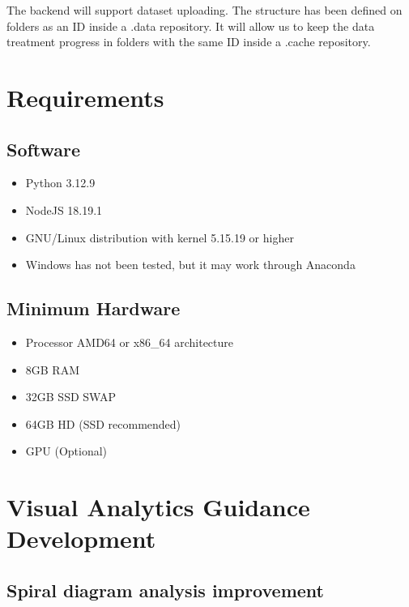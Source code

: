 \documentclass[a4paper]{article}
\begin{document}
The backend will support dataset uploading. The structure has been defined on folders as an ID inside a .data repository. It will allow us to keep the data treatment progress in folders with the same ID inside a .cache repository.

\section{Requirements}
\label{sec:org3f6bbcd}

\subsection{Software}
\label{sec:org50fc679}

\begin{itemize}
\item Python 3.12.9

\item NodeJS 18.19.1

\item GNU/Linux distribution with kernel 5.15.19 or higher

\item Windows has not been tested, but it may work through Anaconda
\end{itemize}

\subsection{Minimum Hardware}
\label{sec:orgfaaeb85}

\begin{itemize}
\item Processor AMD64 or x86\_64 architecture

\item 8GB RAM

\item 32GB SSD SWAP

\item 64GB HD (SSD recommended)

\item GPU (Optional)
\end{itemize}

\section{Visual Analytics Guidance Development}
\label{sec:orgd110472}

\subsection{Spiral diagram analysis improvement}
\label{sec:org80f89ed}
\end{document}
